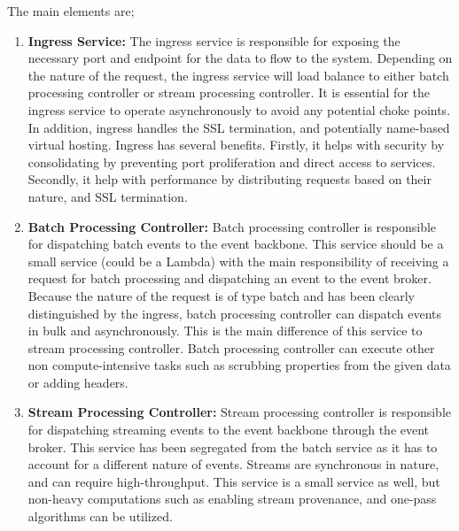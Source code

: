 \documentclass[review]{elsarticle}
\begin{document}
The main elements are; 

\begin{enumerate}
    \item \textbf{Ingress Service:} The ingress service is responsible for exposing the necessary port and endpoint for the data to flow to the system. Depending on the nature of the request, the ingress service will load balance to either batch processing controller or stream processing controller. It is essential for the ingress service to operate asynchronously to avoid any potential choke points. In addition, ingress handles the SSL termination, and potentially name-based virtual hosting. Ingress has several benefits. Firstly, it helps with security by consolidating by preventing port proliferation and direct access to services. Secondly, it help with performance by distributing requests based on their nature, and SSL termination. 
    \item \textbf{Batch Processing Controller:} Batch processing controller is responsible for dispatching batch events to the event backbone. This service should be a small service (could be a Lambda) with the main responsibility of receiving a request for batch processing and dispatching an event to the event broker. Because the nature of the request is of type batch and has been clearly distinguished by the ingress, batch processing controller can dispatch events in bulk and asynchronously. This is the main difference of this service to stream processing controller. Batch processing controller can execute other non compute-intensive tasks such as scrubbing properties from the given data or adding headers.
    \item \textbf{Stream Processing Controller:} Stream processing controller is responsible for dispatching streaming events to the event backbone through the event broker. This service has been segregated from the batch service as it has to account for a different nature of events. Streams are synchronous in nature, and can require high-throughput. This service is a small service as well, but non-heavy computations such as enabling stream provenance, and one-pass algorithms can be utilized. 

\end{enumerate}
\end{document}
